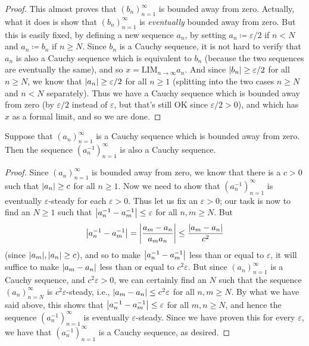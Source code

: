 \begin{proof}
  This almost proves that \((b_n)_{n = 1}^{\infty}\) is bounded away from zero.
  Actually, what it does is show that \((b_n)_{n = 1}^{\infty}\) is \emph{eventually} bounded away from zero.
  But this is easily fixed, by defining a new sequence \(a_n\), by setting \(a_n \coloneqq \varepsilon / 2\) if \(n < N\) and \(a_n \coloneqq b_n\) if \(n \geq N\).
  Since \(b_n\) is a Cauchy sequence, it is not hard to verify that \(a_n\) is also a Cauchy sequence which is equivalent to \(b_n\) (because the two sequences are eventually the same), and so \(x = \text{LIM}_{n \to \infty} a_n\).
  And since \(\left\lvert b_n\right\rvert \geq \varepsilon / 2\) for all \(n \geq N\), we know that \(\left\lvert a_n\right\rvert \geq \varepsilon / 2\) for all \(n \geq 1\) (splitting into the two cases \(n \geq N\) and \(n < N\) separately).
  Thus we have a Cauchy sequence which is bounded away from zero (by \(\varepsilon / 2\) instead of \(\varepsilon\), but that's still OK since \(\varepsilon / 2 > 0\)), and which has \(x\) as a formal limit, and so we are done.
\end{proof}

\begin{lem}\label{5.3.15}
  Suppose that \((a_n)_{n = 1}^{\infty}\) is a Cauchy sequence which is bounded away from zero.
  Then the sequence \((a_n^{-1})_{n = 1}^{\infty}\) is also a Cauchy sequence.
\end{lem}

\begin{proof}
  Since \((a_n)_{n = 1}^{\infty}\) is bounded away from zero, we know that there is a \(c > 0\) such that \(\left\lvert a_n\right\rvert \geq c\) for all \(n \geq 1\).
  Now we need to show that \((a_n^{-1})_{n = 1}^{\infty}\) is eventually \(\varepsilon\)-steady for each \(\varepsilon > 0\).
  Thus let us fix an \(\varepsilon > 0\);
  our task is now to find an \(N \geq 1\) such that \(\left\lvert a_n^{-1} - a_m^{-1}\right\rvert \leq \varepsilon\) for all \(n, m \geq N\).
  But
  \[
    \left\lvert a_n^{-1} - a_m^{-1}\right\rvert = \left\lvert\dfrac{a_m - a_n}{a_m a_n}\right\rvert \leq \dfrac{\left\lvert a_m - a_n\right\rvert}{c^2}
  \]
  (since \(\abs{a_m}, \abs{a_n} \geq c\)), and so to make \(\left\lvert a_n^{-1} - a_m^{-1}\right\rvert\) less than or equal to \(\varepsilon\), it will suffice to make \(\left\lvert a_m - a_n\right\rvert\) less than or equal to \(c^2 \varepsilon\).
  But since \((a_n)_{n = 1}^{\infty}\) is a Cauchy sequence, and \(c^2 \varepsilon > 0\), we can certainly find an \(N\) such that the sequence \((a_n)_{n = N}^{\infty}\) is \(c^2 \varepsilon\)-steady, i.e., \(\left\lvert a_m - a_n\right\rvert \leq c^2 \varepsilon\) for all \(n, m \geq N\).
  By what we have said above, this shows that \(\left\lvert a_n^{-1} - a_m^{-1}\right\rvert \leq \varepsilon\) for all \(m, n \geq N\), and hence the sequence \((a_n^{-1})_{n = 1}^{\infty}\) is eventually \(\varepsilon\)-steady.
  Since we have proven this for every \(\varepsilon\), we have that \((a_n^{-1})_{n = 1}^{\infty}\) is a Cauchy sequence, as desired.
\end{proof}

